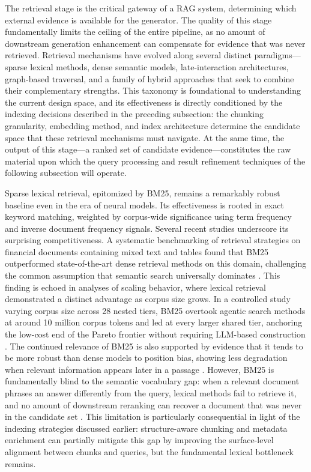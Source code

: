 \documentclass[11pt]{article}
\begin{document}
The retrieval stage is the critical gateway of a RAG system, determining which external evidence is available for the generator. The quality of this stage fundamentally limits the ceiling of the entire pipeline, as no amount of downstream generation enhancement can compensate for evidence that was never retrieved. Retrieval mechanisms have evolved along several distinct paradigms---sparse lexical methods, dense semantic models, late-interaction architectures, graph-based traversal, and a family of hybrid approaches that seek to combine their complementary strengths. This taxonomy is foundational to understanding the current design space, and its effectiveness is directly conditioned by the indexing decisions described in the preceding subsection: the chunking granularity, embedding method, and index architecture determine the candidate space that these retrieval mechanisms must navigate. At the same time, the output of this stage---a ranked set of candidate evidence---constitutes the raw material upon which the query processing and result refinement techniques of the following subsection will operate.

Sparse lexical retrieval, epitomized by BM25, remains a remarkably robust baseline even in the era of neural models. Its effectiveness is rooted in exact keyword matching, weighted by corpus-wide significance using term frequency and inverse document frequency signals. Several recent studies underscore its surprising competitiveness. A systematic benchmarking of retrieval strategies on financial documents containing mixed text and tables found that BM25 outperformed state-of-the-art dense retrieval methods on this domain, challenging the common assumption that semantic search universally dominates \cite{ref99}. This finding is echoed in analyses of scaling behavior, where lexical retrieval demonstrated a distinct advantage as corpus size grows. In a controlled study varying corpus size across 28 nested tiers, BM25 overtook agentic search methods at around 10 million corpus tokens and led at every larger shared tier, anchoring the low-cost end of the Pareto frontier without requiring LLM-based construction \cite{ref100}. The continued relevance of BM25 is also supported by evidence that it tends to be more robust than dense models to position bias, showing less degradation when relevant information appears later in a passage \cite{ref101}. However, BM25 is fundamentally blind to the semantic vocabulary gap: when a relevant document phrases an answer differently from the query, lexical methods fail to retrieve it, and no amount of downstream reranking can recover a document that was never in the candidate set \cite{ref102}. This limitation is particularly consequential in light of the indexing strategies discussed earlier: structure-aware chunking and metadata enrichment can partially mitigate this gap by improving the surface-level alignment between chunks and queries, but the fundamental lexical bottleneck remains.
\end{document}
